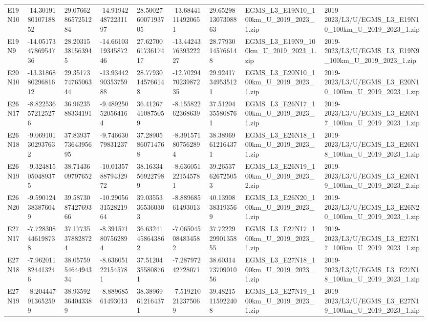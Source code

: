 \begin{landscape}
\begin{longtable}{lllllllll}
E19N10 & -14.301918010718852 & 29.076628657251284 & -14.919424872231197 & 28.500276007193705 & -13.68441114920651 & 29.652981307308863 & EGMS\_L3\_E19N10\_100km\_U\_2019\_2023\_1.zip & 2019-2023/L3/U/EGMS\_L3\_E19N10\_100km\_U\_2019\_2023\_1.zip \\
E19N9 & -14.051734786954736 & 28.20315381563945 & -14.661031934587246 & 27.627006173617417 & -13.442437639322227 & 28.77930145766148 & EGMS\_L3\_E19N9\_100km\_U\_2019\_2023\_1.zip & 2019-2023/L3/U/EGMS\_L3\_E19N9\_100km\_U\_2019\_2023\_1.zip \\
E20N10 & -13.318688029681612 & 29.351737476506344 & -13.934429035375988 & 28.77930145766148 & -12.702947023987235 & 29.92417349535121 & EGMS\_L3\_E20N10\_100km\_U\_2019\_2023\_1.zip & 2019-2023/L3/U/EGMS\_L3\_E20N10\_100km\_U\_2019\_2023\_1.zip \\
E26N17 & -8.822536572125276 & 36.9623588334191 & -9.489250520564164 & 36.41267410875059 & -8.15582262368639 & 37.51204355808761 & EGMS\_L3\_E26N17\_100km\_U\_2019\_2023\_1.zip & 2019-2023/L3/U/EGMS\_L3\_E26N17\_100km\_U\_2019\_2023\_1.zip \\
E26N18 & -9.069101302937632 & 37.839377364395695 & -9.74663079831237 & 37.28905860714768 & -8.391571807562894 & 38.38969612164371 & EGMS\_L3\_E26N18\_100km\_U\_2019\_2023\_1.zip & 2019-2023/L3/U/EGMS\_L3\_E26N18\_100km\_U\_2019\_2023\_1.zip \\
E26N19 & -9.324815050489375 & 38.7143609797652 & -10.013578879432972 & 38.16334569227989 & -8.636051221545781 & 39.26537626725053 & EGMS\_L3\_E26N19\_100km\_U\_2019\_2023\_2.zip & 2019-2023/L3/U/EGMS\_L3\_E26N19\_100km\_U\_2019\_2023\_2.zip \\
E26N20 & -9.590124383876049 & 39.587308742769366 & -10.290563152821964 & 39.03553365360303 & -8.88968561493013 & 40.13908383193569 & EGMS\_L3\_E26N20\_100km\_U\_2019\_2023\_1.zip & 2019-2023/L3/U/EGMS\_L3\_E26N20\_100km\_U\_2019\_2023\_1.zip \\
E27N17 & -7.728308446198738 & 37.17735378828724 & -8.391571807562894 & 36.63241458643862 & -7.065045084834582 & 37.722292990135855 & EGMS\_L3\_E27N17\_100km\_U\_2019\_2023\_1.zip & 2019-2023/L3/U/EGMS\_L3\_E27N17\_100km\_U\_2019\_2023\_1.zip \\
E27N18 & -7.962011824413246 & 38.057595464494334 & -8.636051221545781 & 37.51204355808761 & -7.28797242728071 & 38.603147370901056 & EGMS\_L3\_E27N18\_100km\_U\_2019\_2023\_1.zip & 2019-2023/L3/U/EGMS\_L3\_E27N18\_100km\_U\_2019\_2023\_1.zip \\
E27N19 & -8.204447913652599 & 38.93592364043389 & -8.88968561493013 & 38.38969612164371 & -7.519210212375069 & 39.48215115922408 & EGMS\_L3\_E27N19\_100km\_U\_2019\_2023\_1.zip & 2019-2023/L3/U/EGMS\_L3\_E27N19\_100km\_U\_2019\_2023\_1.zip \\

\end{longtable}
\end{landscape}
